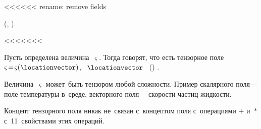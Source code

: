 \begin{otherlanguage}{russian}
\end{otherlanguage}



\label{para:spatialdifferentiationoftensorfields} <<<<<< rename: remove fields

\begin{changemargin}{\parindent}{\parindent}
\vspace{-0.1em}
\small
\flushright
\textit{}\ru{\:---} \ru{,}  (, ).

\par\vspace{.3em}
\end{changemargin}

\begin{otherlanguage}{russian}

<<<<<<<

\noindent
Пусть    определена величина~$\varsigma$.
Тогда говорят, что есть тензорное поле~${\varsigma \!=\! \varsigma(\locationvector)}$, ~$\locationvector$\ru{\:---} ~()  .

Величина~$\varsigma$ может~быть тензором любой сложности.
Пример скалярного поля\:--- поле температуры в~среде, векторного поля\:--- скорости частиц жидкости.

Концепт тензорного поля никак не~связан с~концептом поля с~операциями $+$ и~$*$ с~11~свойствами этих операций.

\end{otherlanguage}



